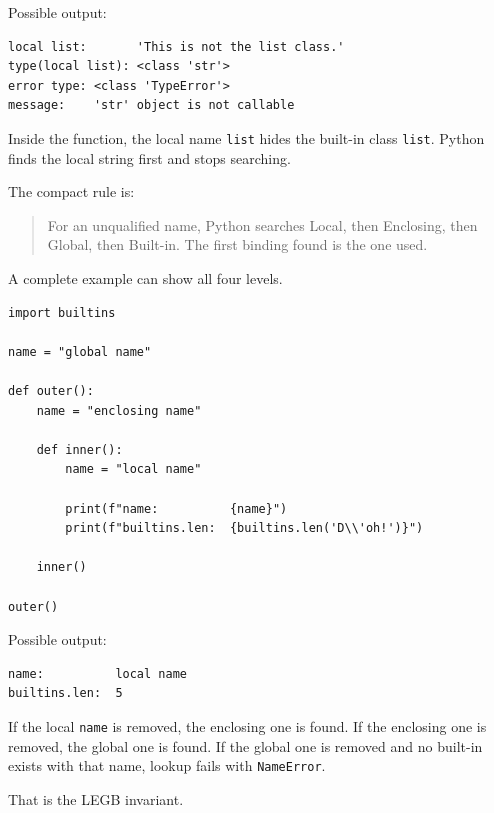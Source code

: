 Possible output:

\begin{verbatim}
local list:       'This is not the list class.'
type(local list): <class 'str'>
error type: <class 'TypeError'>
message:    'str' object is not callable
\end{verbatim}

Inside the function, the local name \texttt{list} hides the built-in class \texttt{list}. Python finds the local string first and stops searching.

The compact rule is:

\begin{quote}
For an unqualified name, Python searches Local, then Enclosing, then Global, then Built-in. The first binding found is the one used.
\end{quote}

A complete example can show all four levels.

\begin{verbatim}
import builtins

name = "global name"

def outer():
    name = "enclosing name"

    def inner():
        name = "local name"

        print(f"name:          {name}")
        print(f"builtins.len:  {builtins.len('D\\'oh!')}")

    inner()

outer()
\end{verbatim}

Possible output:

\begin{verbatim}
name:          local name
builtins.len:  5
\end{verbatim}

If the local \texttt{name} is removed, the enclosing one is found. If the enclosing one is removed, the global one is found. If the global one is removed and no built-in exists with that name, lookup fails with \texttt{NameError}.

That is the LEGB invariant.